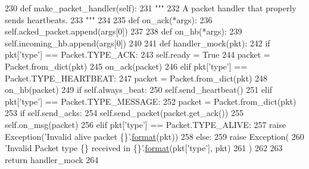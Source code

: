 \begin{DoxyCode}
230     \textcolor{keyword}{def }make\_packet\_handler(self):
231         \textcolor{stringliteral}{"""}
232 \textcolor{stringliteral}{        A packet handler that properly sends heartbeats.}
233 \textcolor{stringliteral}{        """}
234 
235         \textcolor{keyword}{def }on\_ack(*args):
236             self.acked\_packet.append(args[0])
237 
238         \textcolor{keyword}{def }on\_hb(*args):
239             self.incoming\_hb.append(args[0])
240 
241         \textcolor{keyword}{def }handler\_mock(pkt):
242             \textcolor{keywordflow}{if} pkt[\textcolor{stringliteral}{'type'}] == Packet.TYPE\_ACK:
243                 self.ready = \textcolor{keyword}{True}
244                 packet = Packet.from\_dict(pkt)
245                 on\_ack(packet)
246             \textcolor{keywordflow}{elif} pkt[\textcolor{stringliteral}{'type'}] == Packet.TYPE\_HEARTBEAT:
247                 packet = Packet.from\_dict(pkt)
248                 on\_hb(packet)
249                 \textcolor{keywordflow}{if} self.always\_beat:
250                     self.send\_heartbeat()
251             \textcolor{keywordflow}{elif} pkt[\textcolor{stringliteral}{'type'}] == Packet.TYPE\_MESSAGE:
252                 packet = Packet.from\_dict(pkt)
253                 \textcolor{keywordflow}{if} self.send\_acks:
254                     self.send\_packet(packet.get\_ack())
255                 self.on\_msg(packet)
256             \textcolor{keywordflow}{elif} pkt[\textcolor{stringliteral}{'type'}] == Packet.TYPE\_ALIVE:
257                 \textcolor{keywordflow}{raise} Exception(\textcolor{stringliteral}{'Invalid alive packet \{\}'}.\hyperlink{namespaceparlai_1_1chat__service_1_1services_1_1messenger_1_1shared__utils_a32e2e2022b824fbaf80c747160b52a76}{format}(pkt))
258             \textcolor{keywordflow}{else}:
259                 \textcolor{keywordflow}{raise} Exception(
260                     \textcolor{stringliteral}{'Invalid Packet type \{\} received in \{\}'}.\hyperlink{namespaceparlai_1_1chat__service_1_1services_1_1messenger_1_1shared__utils_a32e2e2022b824fbaf80c747160b52a76}{format}(pkt[\textcolor{stringliteral}{'type'}], pkt)
261                 )
262 
263         \textcolor{keywordflow}{return} handler\_mock
264 
\end{DoxyCode}
\mbox{\label{classparlai_1_1mturk_1_1core_1_1legacy__2018_1_1test_1_1test__full__system_1_1MockAgent_a281a8c558ec06f7a8ea1244a473b8b0b}} 
